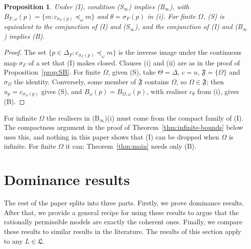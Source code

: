 \documentclass[11pt]{article}
\newtheorem{proposition}[theorem]{Proposition}
\theoremstyle{definition}
\theoremstyle{remark}
\newcommand{\F}{\mathfrak F}
\begin{document}
\begin{proposition}\label{prop:SBinfty}
Under (I), condition (S$_\infty$) implies (B$_\infty$), with $B_{F,\omega}(p)=\{m:c_{\sigma_F(p)}\preceq_\omega m\}$ and $\theta=\sigma_F(p)$ in (i). For finite $\Omega$, (S) is equivalent to the conjunction of (I) and (S$_\infty$), and the conjunction of (I) and (B$_\infty$) implies (B).
\end{proposition}
\begin{proof}
The set $\{p\in\Delta_F:c_{\sigma_F(p)}\preceq_\omega m\}$ is the inverse image under the continuous map $\sigma_F$ of a set that (I) makes closed. Clauses (i) and (ii) are as in the proof of Proposition~\ref{prop:SB}. For finite $\Omega$, given (S), take $\Theta=\Delta$, $c=u$, $\F=\{\Omega\}$ and $\sigma_\Omega$ the identity. Conversely, some member of $\F$ contains $\Omega$, so $\Omega\in\F$; then $u_p=c_{\sigma_\Omega(p)}$ gives (S), and $B_\omega(p)=B_{\Omega,\omega}(p)$, with realiser $c_\theta$ from (i), gives (B).
\end{proof}
For infinite $\Omega$ the realisers in (B$_\infty$)(i) must come from the compact family of (I). The compactness argument in the proof of Theorem~\ref{thm:infinite-bounds} below uses this, and nothing in this paper shows that (I) can be dropped when $\Omega$ is infinite. For finite $\Omega$ it can: Theorem~\ref{thm:main} needs only (B).

\section{Dominance results}\label{sec:results}
The rest of the paper splits into three parts. Firstly, we prove dominance results. After that, we provide a general recipe for using these results to argue that the rationally permissible models are exactly the coherent ones. Finally, we compare these results to similar results in the literature. The results of this section apply to any $L\in\mathfrak L$.
\end{document}
